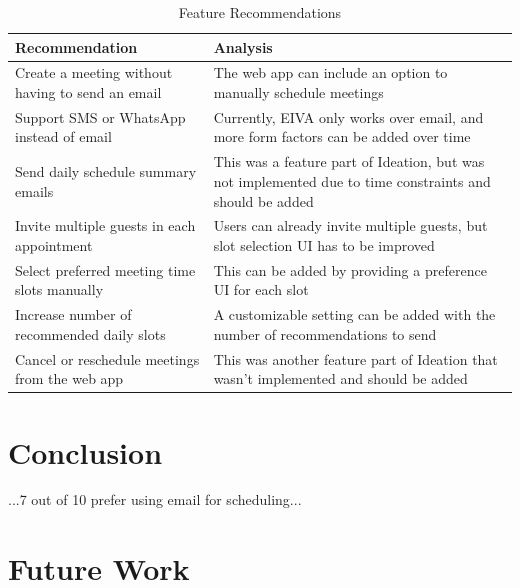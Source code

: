 \documentclass{article}
\begin{document}
\begin{table}[!htb]
	\caption{Feature Recommendations}
	\centering
	\begin{tabular}{p{4cm}p{7cm}}
		\hline
		\textbf{Recommendation}                          & \textbf{Analysis}                                                                                        \\
		\hline
		Create a meeting without having to send an email & The web app can include an option to manually schedule meetings                                          \\
		\hline
		Support SMS or WhatsApp instead of email         & Currently, EIVA only works over email, and more form factors can be added over time                      \\
		\hline
		Send daily schedule summary emails               & This was a feature part of Ideation, but was not implemented due to time constraints and should be added \\
		\hline
		Invite multiple guests in each appointment       & Users can already invite multiple guests, but slot selection UI has to be improved                       \\
		\hline
		Select preferred meeting time slots manually     & This can be added by providing a preference UI for each slot                                             \\
		\hline
		Increase number of recommended daily slots       & A customizable setting can be added with the number of recommendations to send                           \\
		\hline
		Cancel or reschedule meetings from the web app   & This was another feature part of Ideation that wasn't implemented and should be added                    \\
		\hline
	\end{tabular}
\end{table}

\newpage

\section{Conclusion}

...7 out of 10 prefer using email for scheduling...

\newpage

\section{Future Work}
\end{document}
